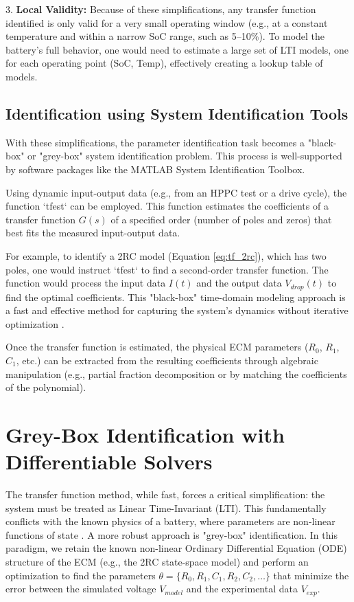 \documentclass[]{article}
\begin{document}
3.  \textbf{Local Validity:} Because of these simplifications, any transfer function identified is only valid for a very small operating window (e.g., at a constant temperature and within a narrow SoC range, such as 5–10\%). To model the battery's full behavior, one would need to estimate a large set of LTI models, one for each operating point (SoC, Temp), effectively creating a lookup table of models.

\subsection{Identification using System Identification Tools}

With these simplifications, the parameter identification task becomes a "black-box" or "grey-box" system identification problem. This process is well-supported by software packages like the MATLAB System Identification Toolbox.

Using dynamic input-output data (e.g., from an HPPC test or a drive cycle), the function `tfest` can be employed. This function estimates the coefficients of a transfer function $G(s)$ of a specified order (number of poles and zeros) that best fits the measured input-output data.

For example, to identify a 2RC model (Equation \ref{eq:tf_2rc}), which has two poles, one would instruct `tfest` to find a second-order transfer function. The function would process the input data $I(t)$ and the output data $V_{drop}(t)$ to find the optimal coefficients. This "black-box" time-domain modeling approach is a fast and effective method for capturing the system's dynamics without iterative optimization \cite{khalfi2021boxjenkins, pai2023online}.

Once the transfer function is estimated, the physical ECM parameters ($R_0$, $R_1$, $C_1$, etc.) can be extracted from the resulting coefficients through algebraic manipulation (e.g., partial fraction decomposition or by matching the coefficients of the polynomial).

\section{Grey-Box Identification with Differentiable Solvers}

The transfer function method, while fast, forces a critical simplification: the system must be treated as Linear Time-Invariant (LTI). This fundamentally conflicts with the known physics of a battery, where parameters are non-linear functions of state \cite{tran2021comprehensive}. A more robust approach is "grey-box" identification. In this paradigm, we retain the known non-linear Ordinary Differential Equation (ODE) structure of the ECM (e.g., the 2RC state-space model) and perform an optimization to find the parameters $\theta = \{R_0, R_1, C_1, R_2, C_2, \dots\}$ that minimize the error between the simulated voltage $V_{model}$ and the experimental data $V_{exp}$.
\end{document}
